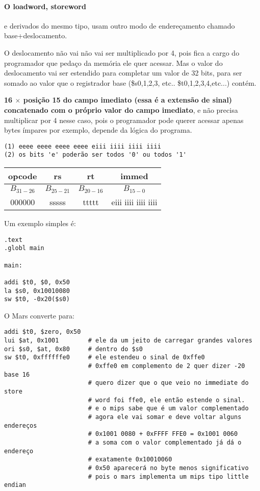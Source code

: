 \documentclass{article}
\begin{document}
\pagebreak
\paragraph{O loadword, storeword} e derivados do mesmo tipo, usam outro modo de 
endereçamento chamado base+deslocamento.

O deslocamento não vai não vai ser multiplicado por 4, pois fica a cargo do 
programador que pedaço da memória ele quer acessar. Mas o valor do deslocamento
vai ser estendido para completar um valor de 32 bits, para ser somado ao valor 
que o registrador base (\$s0,1,2,3, etc.. \$t0,1,2,3,4,etc...) contém.

\textbf{16 $\times$ {posição 15 do campo imediato} (essa é a extensão de 
sinal) concatenado com o próprio valor do campo imediato}, e não precisa 
multiplicar por 4 nesse caso, pois o programador pode querer acessar apenas 
bytes ímpares por exemplo, depende da lógica do programa.

\begin{verbatim}
(1) eeee eeee eeee eeee eiii iiii iiii iiii
(2) os bits 'e' poderão ser todos '0' ou todos '1'
\end{verbatim}

\begin{table}[ht!]
  \begin{tabular}{|c|c|c|c|}
    \hline opcode & rs & rt & immed \\ 
    \hline $B_{31-26}$ & $B_{25-21}$ & $B_{20-16}$ & $B_{15-0}$ \\ 
    \hline 000000 & sssss & ttttt & eiii iiii iiii iiii \\ 
    \hline
  \end{tabular}
\end{table}

Um exemplo simples é:

\begin{verbatim}
.text
.globl main

main:

addi $t0, $0, 0x50
la $s0, 0x10010080
sw $t0, -0x20($s0)
\end{verbatim}

O Mars converte para:

\begin{verbatim}
addi $t0, $zero, 0x50
lui $at, 0x1001        # ele da um jeito de carregar grandes valores
ori $s0, $at, 0x80     # dentro do $s0
sw $t0, 0xffffffe0     # ele estendeu o sinal de 0xffe0
                       # 0xffe0 em complemento de 2 quer dizer -20 base 16
                       # quero dizer que o que veio no immediate do store
                       # word foi ffe0, ele então estende o sinal.
                       # e o mips sabe que é um valor complementado
                       # agora ele vai somar e deve voltar alguns endereços
                       # 0x1001 0080 + 0xFFFF FFE0 = 0x1001 0060
                       # a soma com o valor complementado já dá o endereço
                       # exatamente 0x10010060
                       # 0x50 aparecerá no byte menos significativo
                       # pois o mars implementa um mips tipo little endian
\end{verbatim}
\end{document}
